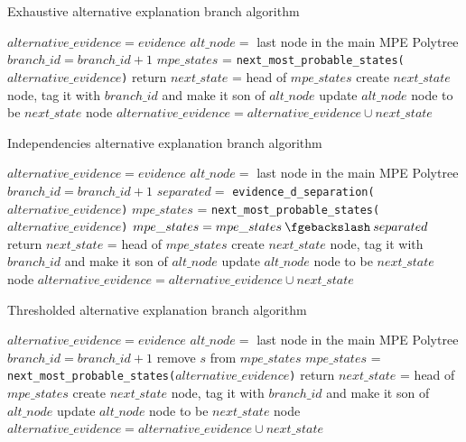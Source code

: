 \begin{algorithm}[htp!]
	\caption{Exhaustive alternative explanation branch algorithm}
	\label{alg:alternative-branch-exhaustive}
	\begin{algorithmic}[1]
		\State $alternative\_evidence = evidence$ 
		\State $alt\_node = $ last node in the main MPE Polytree
		\State $branch\_id = branch\_id + 1$
			\State $mpe\_states$ = \texttt{next\_most\_probable\_states($alternative\_evidence$)}
				\State return
			\Else
				\State $next\_state$ = head of $mpe\_states$ 
				\State create $next\_state$ node, tag it with $branch\_id$ and make it son of $alt\_node$
				\State update $alt\_node$ node to be $next\_state$ node
				\State $alternative\_evidence = alternative\_evidence \cup next\_state$
			\EndIf
		\EndWhile
	\end{algorithmic}
\end{algorithm}

\begin{algorithm}[htp!]
	\caption{Independencies alternative explanation branch algorithm}
	\label{alg:alternative-branch-independencies}
	\begin{algorithmic}[1]
		\State $alternative\_evidence = evidence$ 
		\State $alt\_node = $ last node in the main MPE Polytree
		\State $branch\_id = branch\_id + 1$
			\State $separated = $ \texttt{evidence\_d\_separation($alternative\_evidence$)}
			\State $mpe\_states$ = \texttt{next\_most\_probable\_states($alternative\_evidence$)}
			\State $mpe\_states = mpe\_states \mysetminus separated$ 
				\State return
			\Else
				\State $next\_state$ = head of $mpe\_states$ 
				\State create $next\_state$ node, tag it with $branch\_id$ and make it son of $alt\_node$
				\State update $alt\_node$ node to be $next\_state$ node
				\State $alternative\_evidence = alternative\_evidence \cup next\_state$
			\EndIf
		\EndWhile
	\end{algorithmic}
\end{algorithm} 

\begin{algorithm}[htp!]
	\caption{Thresholded alternative explanation branch algorithm}
	\label{alg:alternative-branch-thresholded}
	\begin{algorithmic}[1]
		\State $alternative\_evidence = evidence$ 
		\State $alt\_node = $ last node in the main MPE Polytree
		\State $branch\_id = branch\_id + 1$
					\State remove $s$ from $mpe\_states$ 
				\EndIf
			\EndFor	
			\State $mpe\_states$ = \texttt{next\_most\_probable\_states($alternative\_evidence$)}
				\State return
			\Else
				\State $next\_state$ = head of $mpe\_states$ 
				\State create $next\_state$ node, tag it with $branch\_id$ and make it son of $alt\_node$
				\State update $alt\_node$ node to be $next\_state$ node
				\State $alternative\_evidence = alternative\_evidence \cup next\_state$
			\EndIf
		\EndWhile
	\end{algorithmic}
\end{algorithm} 

